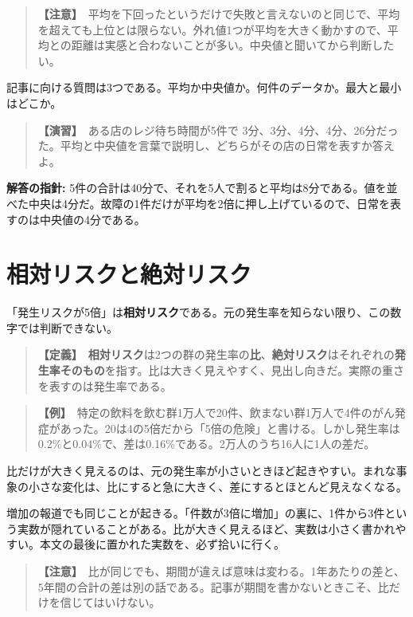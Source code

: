 \documentclass{article}
\begin{document}
\begin{quote}
\textbf{【注意】}\ 平均を下回ったというだけで失敗と言えないのと同じで、平均を超えても上位とは限らない。外れ値1つが平均を大きく動かすので、平均との距離は実感と合わないことが多い。中央値と聞いてから判断したい。
\end{quote}

記事に向ける質問は3つである。平均か中央値か。何件のデータか。最大と最小はどこか。

\begin{quote}
\textbf{【演習】}\ ある店のレジ待ち時間が5件で 3分、3分、4分、4分、26分だった。平均と中央値を言葉で説明し、どちらがその店の日常を表すか答えよ。
\end{quote}

\textbf{解答の指針:} 5件の合計は40分で、それを5人で割ると平均は8分である。値を並べた中央は4分だ。故障の1件だけが平均を2倍に押し上げているので、日常を表すのは中央値の4分である。

\section{相対リスクと絶対リスク}

「発生リスクが5倍」は\textbf{相対リスク}である。元の発生率を知らない限り、この数字では判断できない。

\begin{quote}
\textbf{【定義】}\ \textbf{相対リスク}は2つの群の発生率の\textbf{比}、\textbf{絶対リスク}はそれぞれの\textbf{発生率そのもの}を指す。比は大きく見えやすく、見出し向きだ。実際の重さを表すのは発生率である。
\end{quote}

\begin{quote}
\textbf{【例】}\ 特定の飲料を飲む群1万人で20件、飲まない群1万人で4件のがん発症があった。20は4の5倍だから「5倍の危険」と書ける。しかし発生率は0.2\%と0.04\%で、差は0.16\%である。2万人のうち16人に1人の差だ。
\end{quote}

比だけが大きく見えるのは、元の発生率が小さいときほど起きやすい。まれな事象の小さな変化は、比にすると急に大きく、差にするとほとんど見えなくなる。

増加の報道でも同じことが起きる。「件数が3倍に増加」の裏に、1件から3件という実数が隠れていることがある。比が大きく見えるほど、実数は小さく書かれやすい。本文の最後に置かれた実数を、必ず拾いに行く。

\begin{quote}
\textbf{【注意】}\ 比が同じでも、期間が違えば意味は変わる。1年あたりの差と、5年間の合計の差は別の話である。記事が期間を書かないときこそ、比だけを信じてはいけない。
\end{quote}
\end{document}
